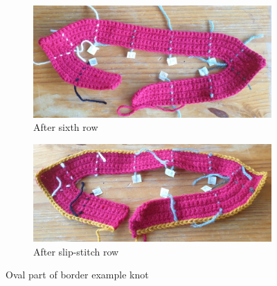 \documentclass[openany]{book}
\newcommand{\bk}{border example knot}
\begin{document}
\begin{figure}[H]\centering
\begin{subfigure}[t]{.45\textwidth}\centering
\includegraphics[width=.95\textwidth]{bk/oval}
\caption{After sixth row}
\end{subfigure}
%
\begin{subfigure}[t]{.45\textwidth}
		\centering
		\includegraphics[width=.95\textwidth]{bk/oval2}
\caption{After slip-stitch row}
\end{subfigure}
\caption{Oval part of \bk}
\end{figure}
\end{document}

